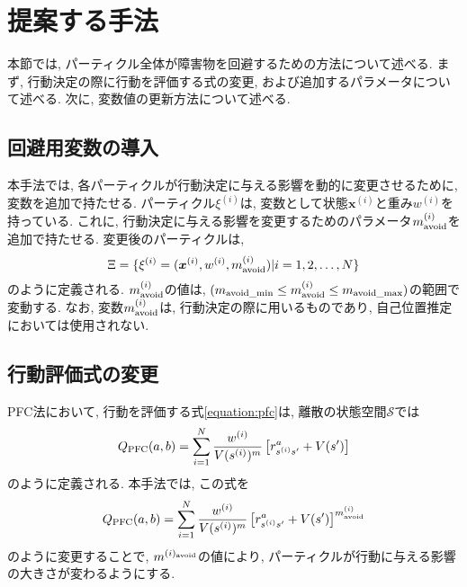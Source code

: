 \section{提案する手法} \label{section:回避重み}
本節では, パーティクル全体が障害物を回避するための方法について述べる. 
まず, 行動決定の際に行動を評価する式の変更, および追加するパラメータについて述べる. 
次に, 変数値の更新方法について述べる. 

\subsection{回避用変数の導入}
本手法では, 各パーティクルが行動決定に与える影響を動的に変更させるために, 変数を追加で持たせる. 
パーティクル$\xi^{(i)}$は,  変数として状態$\bm{x}^{(i)}$と重み$w^{(i)}$を持っている. 
これに, 行動決定に与える影響を変更するためのパラメータ$m^{(i)}_{\rm avoid}$を追加で持たせる. 
変更後のパーティクルは, 
\begin{equation}
\label{particles}
  \Xi = \{ \xi^{(i)} =
               (\bm{x}^{(i)}, w^{(i)}, m^{(i)}_{\rm avoid}) |i = 1,2,\dots,N \}
\end{equation}
のように定義される. 
$m^{(i)}_{\rm avoid}$の値は, $(m_{\rm avoid\_min} \leq m^{(i)}_{\rm avoid} \leq m_{\rm avoid\_max})$の範囲で変動する. 
なお, 変数$m^{(i)}_{\rm avoid}$は, 行動決定の際に用いるものであり, 自己位置推定においては使用されない. 

\subsection{行動評価式の変更}
PFC法において, 行動を評価する式\ref{equation:pfc}は, 離散の状態空間$\mathcal{S}$では
\begin{equation}
\label{equation:finite pfc}
  Q_{\rm PFC}(a, b) = \sum_{i=1}^{N} \frac{ w^{(i)} }{ V(s^{(i)})^{m} }
                      \left[r^{a}_{s^{(i)} s^{\prime}} + V(s^{\prime}) \right]
\end{equation}
のように定義される. 
本手法では, この式を
\begin{equation}
\label{equation:modified pfc}
  Q_{\rm PFC}(a, b) = \sum_{i=1}^{N} \frac{ w^{(i)} }{ V(s^{(i)})^{m} }
                      \left[r^{a}_{s^{(i)} s^{\prime}}
                            + V(s^{\prime}) \right] ^{m^{(i)}_{\rm avoid}}
\end{equation}
のように変更することで, $m^{(i)_{\rm avoid}}$の値により, パーティクルが行動に与える影響の大きさが変わるようにする. 

